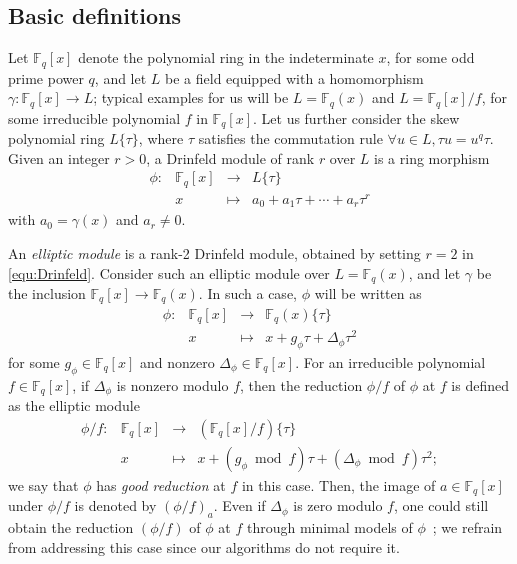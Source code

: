 \documentclass[11pt]{article}
\theoremstyle{definition}
\newcommand{\ang}[1]{\{#1\}}
\def\F{\ensuremath{\mathbb{F}}}
\begin{document}

\subsection{Basic definitions}

Let $\F_q[x]$ denote the polynomial ring in the indeterminate $x$, for
some odd prime power $q$, and let $L$ be a field equipped with a
homomorphism $\gamma:\F_q[x] \to L$; typical examples for us will be
$L=\F_q(x)$ and $L=\F_q[x]/f$, for some irreducible polynomial $f$ in
$\F_q[x]$.  Let us further consider the skew polynomial ring
$L\{\tau\}$, where $\tau$ satisfies the commutation rule $\forall u
\in L, \tau u = u^q \tau$. Given an integer $r > 0$, a Drinfeld module of rank $r$
over $L$ is a ring morphism
\begin{equation}
\label{equ:Drinfeld}
	\begin{array}{rrll}
		\phi : & \F_q[x] & \longrightarrow & L\{\tau\} \\
		& x & \longmapsto & a_0 + a_1\tau + \cdots + a_r\tau^r	
	\end{array}
\end{equation}
with $a_0 = \gamma(x)$ and $a_r \ne 0$. 


An \textit{elliptic module} is a rank-2 Drinfeld module, obtained by
setting $r = 2$ in \eqref{equ:Drinfeld}. Consider such an elliptic module
over $L=\F_q(x)$, and let $\gamma$ be the inclusion $\F_q[x] \to \F_q(x)$.
In such a case, $\phi$ will be written as
\[
\begin{array}{rrll}
	\phi : & \F_q[x] & \longrightarrow & \F_q(x)\ang{\tau} \\
	& x & \longmapsto & x + g_\phi \tau + \Delta_\phi \tau^2	
\end{array}
\]
for some $g_\phi \in \F_q[x]$ and nonzero $\Delta_\phi \in \F_q[x]$. 
For an irreducible polynomial $f \in \F_q[x]$, if $\Delta_\phi$ is
nonzero modulo $f$, then the reduction $\phi/f$ of $\phi$ at $f$ is defined as the elliptic module
\[
\begin{array}{rcll}
	\phi/f : & \F_q[x] & \longrightarrow & (\F_q[x]/f) \ang{\tau} \\
	& x & \longmapsto & x + (g_\phi \bmod f) \tau + (\Delta_\phi\bmod f) \tau^2;
\end{array}
\]
we say that $\phi$ has {\em good reduction} at $f$ in this case.
Then,
 the image of $a \in \F_q[x]$ under $\phi/f$ is denoted by
$(\phi/f)_a$. Even if $\Delta_{\phi}$ is zero modulo $f$, one could
still obtain the reduction $(\phi/f)$ of $\phi$ at $f$ through
minimal models of $\phi$~\cite{gek1}; we refrain from
addressing this case since our algorithms do not require it.
\end{document}
